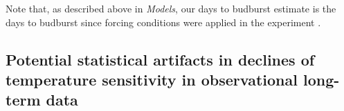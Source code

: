 \documentclass{article}
\begin{document}
\par Note that, as described above in \emph{Models}, our days to budburst estimate is the days to budburst since forcing conditions were applied in the experiment \citep[which we stress is not necessarily the days to budburst after the start of ecodormancy, ][]{chuine2016}.




 



\subsection*{Potential statistical artifacts in declines of temperature sensitivity in observational long-term data} %
\end{document}
